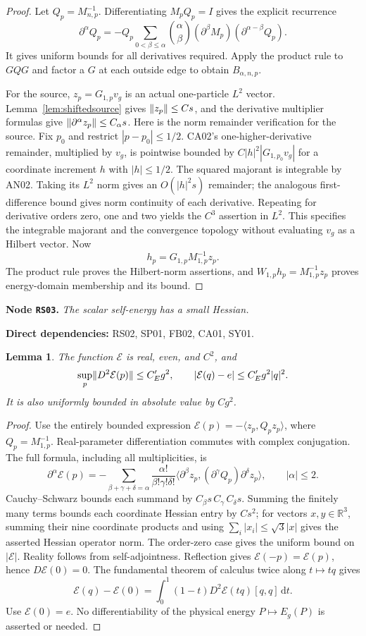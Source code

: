\documentclass[11pt,a4paper]{article}
\newtheorem{lemma}[theorem]{Lemma}
\theoremstyle{remark}\newtheorem{remark}[theorem]{Remark}
\newcommand{\R}{\mathbb R}\newcommand{\C}{\mathbb C}\newcommand{\N}{\mathbb N}
\newcommand{\abs}[1]{\lvert #1\rvert}\newcommand{\rankone}[2]{\lvert #1\rangle\langle #2\rvert}
\newcommand{\dd}{\,\mathrm d}\newcommand{\almosteverywhere}{\text{a.e.}}
\newcommand{\node}[3]{\par\Needspace{6\baselineskip}\smallskip\hypertarget{node:#1}{}\label{nodepage:#1}\noindent\textbf{Node \texttt{#1}.} \textit{#2.}\par\noindent\textbf{Direct dependencies:} #3.\par}
\newcommand{\Ecal}{\mathcal E}
\begin{document}
\begin{proof}
Let $Q_p=M_{n,p}^{-1}$. Differentiating $M_pQ_p=I$ gives the explicit recurrence
\[
 \partial^\alpha Q_p
 =-Q_p\sum_{0<\beta\leq\alpha}\binom{\alpha}{\beta}
      (\partial^\beta M_p)(\partial^{\alpha-\beta}Q_p).
\]
It gives uniform bounds for all derivatives required. Apply the product rule to $GQG$ and factor a $G$ at each outside edge to obtain $B_{\alpha,n,p}$.

For the source, $z_p=G_{1,p}v_g$ is an actual one-particle $L^2$ vector. Lemma~\ref{lem:shiftedsource} gives $\lVert z_p\rVert\leq Cs$, and the derivative multiplier formulas give $\lVert \partial^\alpha z_p\rVert\leq C_\alpha s$. Here is the norm remainder verification for the source. Fix $p_0$ and restrict $|p-p_0|\leq1/2$. CA02's one-higher-derivative remainder, multiplied by $v_g$, is pointwise bounded by
$C|h|^2|G_{1,p_0}v_g|$ for a coordinate increment $h$ with $|h|\leq1/2$. The squared majorant is integrable by AN02. Taking its $L^2$ norm gives an $O(|h|^2s)$ remainder; the analogous first-difference bound gives norm continuity of each derivative. Repeating for derivative orders zero, one and two yields the $C^3$ assertion in $L^2$. This specifies the integrable majorant and the convergence topology without evaluating $v_g$ as a Hilbert vector. Now
\[
 h_p=G_{1,p}M_{1,p}^{-1}z_p.
\]
The product rule proves the Hilbert-norm assertions, and $W_{1,p}h_p=M_{1,p}^{-1}z_p$ proves energy-domain membership and its bound.
\end{proof}

\node{RS03}{The scalar self-energy has a small Hessian}{RS02, SP01, FB02, CA01, SY01}
\begin{lemma}\label{lem:selfenergy}
The function $\Ecal$ is real, even, and $C^2$, and
\[
 \sup_p\norm{D^2\Ecal(p)}\leq C_E' g^2,
 \qquad\abs{\Ecal(q)-e}\leq C_E' g^2\abs q^2.
\]
It is also uniformly bounded in absolute value by $Cg^2$.
\end{lemma}
\begin{proof}
Use the entirely bounded expression $\Ecal(p)=-\langle z_p,Q_pz_p\rangle$, where $Q_p=M_{1,p}^{-1}$. Real-parameter differentiation commutes with complex conjugation. The full formula, including all multiplicities, is
\[
 \partial^\alpha\Ecal(p)=
 -\sum_{\beta+\gamma+\delta=\alpha}
 \frac{\alpha!}{\beta!\gamma!\delta!}
 \langle\partial^\beta z_p,
       (\partial^\gamma Q_p)\partial^\delta z_p\rangle,
 \qquad |\alpha|\leq2.
\]
Cauchy--Schwarz bounds each summand by
$C_\beta s\, C_\gamma\, C_\delta s$. Summing the finitely many terms bounds each coordinate Hessian entry by $Cs^2$; for vectors $x,y\in\R^3$, summing their nine coordinate products and using $\sum_i|x_i|\leq\sqrt3|x|$ gives the asserted Hessian operator norm. The order-zero case gives the uniform bound on $|\Ecal|$. Reality follows from self-adjointness. Reflection gives $\Ecal(-p)=\Ecal(p)$, hence $D\Ecal(0)=0$. The fundamental theorem of calculus twice along $t\mapsto tq$ gives
\[
 \Ecal(q)-\Ecal(0)=\int_0^1(1-t)D^2\Ecal(tq)[q,q]\dd t.
\]
Use $\Ecal(0)=e$. No differentiability of the physical energy $P\mapsto E_g(P)$ is asserted or needed.
\end{proof}
\end{document}
